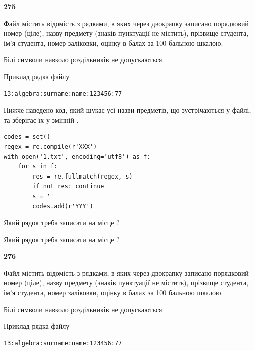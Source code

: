 \newpage

{\begin {center}\textbf{ 275}\end {center}}\par
Файл  містить відомість з рядками, в яких через двокрапку записано поряд\-ковий номер (ціле), назву предмету (знаків пунктуації не містить), прізвище студента, ім'я студента, номер заліковки, оцінку в балах за 100 бальною шкалою.

Білі символи навколо роздільників не допускаються.

Приклад рядка файлу



\begin{verbatim}
13:algebra:surname:name:123456:77
\end{verbatim}


Нижче наведено код, який шукає усі назви предметів, що зустрічаються у файлі, та зберігає їх у змінній .



\begin{verbatim}
codes = set()
regex = re.compile(r'XXX')
with open('1.txt', encoding='utf8') as f:
    for s in f:
        res = re.fullmatch(regex, s)
        if not res: continue
        s = ''
        codes.add(r'YYY')
\end{verbatim}





Який рядок треба записати на місце  ?\par
\vspace{5mm}


Який рядок треба записати на місце  ?\par


\newpage

{\begin {center}\textbf{ 276}\end {center}}\par
Файл  містить відомість з рядками, в яких через двокрапку записано поряд\-ковий номер (ціле), назву предмету (знаків пунктуації не містить), прізвище студента, ім'я студента, номер заліковки, оцінку в балах за 100 бальною шкалою.

Білі символи навколо роздільників не допускаються.

Приклад рядка файлу



\begin{verbatim}
13:algebra:surname:name:123456:77
\end{verbatim}


